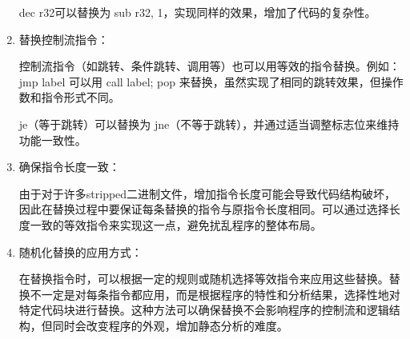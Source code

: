 \begin{enumerate}
dec r32可以替换为 sub r32, 1，实现同样的效果，增加了代码的复杂性。


\item 替换控制流指令：


控制流指令（如跳转、条件跳转、调用等）也可以用等效的指令替换。例如：
jmp label 可以用 call label; pop 来替换，虽然实现了相同的跳转效果，但操作数和指令形式不同。


je（等于跳转）可以替换为 jne（不等于跳转），并通过适当调整标志位来维持功能一致性。


\item 确保指令长度一致：


由于对于许多stripped二进制文件，增加指令长度可能会导致代码结构破坏，因此在替换过程中要保证每条替换的指令与原指令长度相同。可以通过选择长度一致的等效指令来实现这一点，避免扰乱程序的整体布局。


\item 随机化替换的应用方式：


在替换指令时，可以根据一定的规则或随机选择等效指令来应用这些替换。替换不一定是对每条指令都应用，而是根据程序的特性和分析结果，选择性地对特定代码块进行替换。这种方法可以确保替换不会影响程序的控制流和逻辑结构，但同时会改变程序的外观，增加静态分析的难度。


\end{enumerate}

